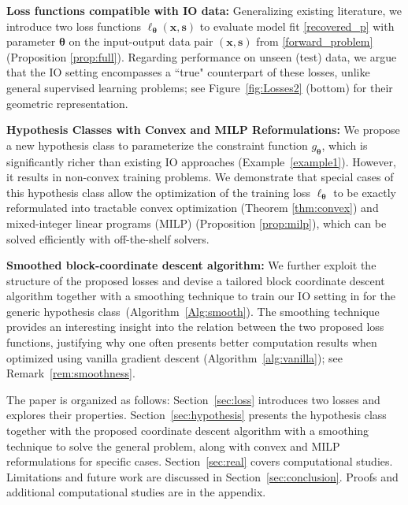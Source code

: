 \documentclass{article}
\theoremstyle{plain}
\begin{document}
    \noindent\textbf{Loss functions compatible with IO data:} Generalizing existing literature, we introduce two loss functions $\ell_{\bm \theta}(\bm x,\bm s)$ to evaluate model fit \eqref{recovered_p} with parameter $\bm \theta$ on the input-output data pair $(\bm x, \bm s)$ from \eqref{forward_problem} (Proposition \ref{prop:full}). Regarding performance on unseen (test) data, we argue that the IO setting encompasses a ``true" counterpart of these losses, unlike general supervised learning problems; see Figure~\ref{fig:Losses2} (bottom) for their geometric representation.
    
    \noindent \textbf{Hypothesis Classes with Convex and MILP Reformulations:} 
    We propose a new hypothesis class to parameterize the constraint function $ g_{\bm{\theta}}$, which is significantly richer than existing IO approaches (Example~\ref{example1}). However, it results in non-convex training problems. We demonstrate that special cases of this hypothesis class allow the optimization of the training loss $ \ell_{\bm{\theta}} $ to be exactly reformulated into tractable convex optimization (Theorem \ref{thm:convex}) and mixed-integer linear programs (MILP) (Proposition \ref{prop:milp}), which can be solved efficiently with off-the-shelf solvers.

    \noindent\textbf{Smoothed block-coordinate descent algorithm:} 
    We further exploit the structure of the proposed losses and devise a tailored block coordinate descent algorithm together with a smoothing technique to train our IO setting in for the generic hypothesis class~(Algorithm~\ref{Alg:smooth}). The smoothing technique provides an interesting insight into the relation between the two proposed loss functions, justifying why one often presents better computation results when optimized using vanilla gradient descent (Algorithm~\ref{alg:vanilla}); see Remark~\ref{rem:smoothness}. 


The paper is organized as follows: Section~\ref{sec:loss} introduces two losses and explores their properties. Section~\ref{sec:hypothesis} presents the hypothesis class together with the proposed  coordinate descent algorithm with a smoothing technique to solve the general problem, along with convex and MILP reformulations for specific cases. Section~\ref{sec:real} covers computational studies. Limitations and future work are discussed in Section~\ref{sec:conclusion}. Proofs and additional computational studies are in the appendix.


 
\end{document}
